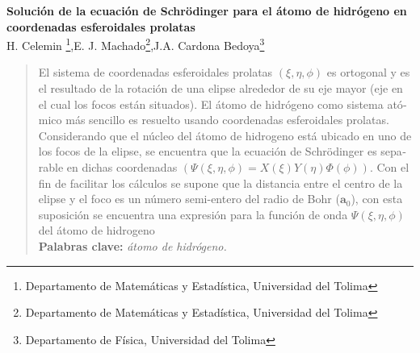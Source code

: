 \documentclass[12pt]{article}
\begin{document}
    \begin{flushleft}
        \vspace{6cm}
        {\huge \textbf{Solución de la ecuación de Schr\"odinger para el átomo de hidrógeno en coordenadas esferoidales prolatas}}\\
        \vspace{2mm}
        {\Large H. Celemin \footnote{Departamento de Matemáticas y Estadística, Universidad del Tolima},E. J. Machado\footnote{Departamento de Matemáticas y Estadística, Universidad del Tolima},J.A. Cardona Bedoya\footnote{Departamento de Física, Universidad del Tolima}}
    \end{flushleft}

    \begin{otherlanguage}{spanish}
        \begin{abstract}
            El sistema de coordenadas esferoidales prolatas $(\xi ,\eta,\phi)$ es ortogonal y es el 
            resultado de la rotación de una elipse alrededor de su eje mayor (eje en el cual 
            los focos están situados). El átomo de hidrógeno como sistema atómico más 
            sencillo es resuelto usando coordenadas esferoidales prolatas. Considerando que 
            el núcleo del átomo de hidrogeno está ubicado en uno de los focos de la elipse, se 
            encuentra que la ecuación de Schr\"odinger es separable en dichas coordenadas 
            $\left(\Psi(\xi,\eta,\phi) = X(\xi)Y(\eta)\Phi(\phi)\right)$. Con el fin de facilitar los cálculos se supone que 
            la distancia entre el centro de la elipse y el foco es un número semi-entero del 
            radio de Bohr ($\textbf{a}_{0}$), con esta suposición se encuentra una expresión para la 
            función de onda $\Psi(\xi,\eta,\phi)$ del átomo de hidrogeno \\
            \textbf{Palabras clave:} \hspace{1mm} \textit{átomo de hidrógeno.}
        \end{abstract}
    \end{otherlanguage}
\end{document}
